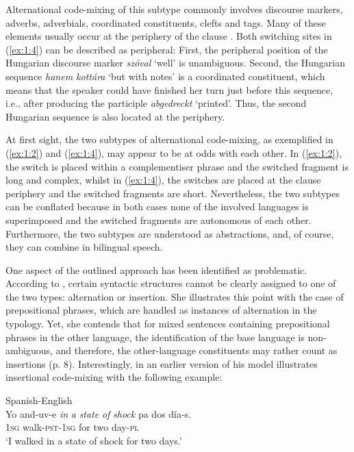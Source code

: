 \noindent Alternational code-mixing of this subtype commonly involves discourse markers, adverbs, adverbials, coordinated constituents, clefts and tags. Many of these elements usually occur at the periphery of the clause \citep[97--99]{muysken-bilingual-2000}. Both switching sites in (\ref{ex:1:4}) can be described as peripheral: First, the peripheral position of the Hungarian discourse marker \textit{szóval} `well' is unambiguous. Second, the Hungarian sequence \textit{hanem kottára} `but with notes' is a coordinated constituent, which means that the speaker could have finished her turn just before this sequence, i.e., after producing the participle \textit{abgedreckt} `printed'. Thus, the second Hungarian sequence is also located at the periphery.

At first sight, the two subtypes of alternational code-mixing, as exemplified in (\ref{ex:1:2}) and (\ref{ex:1:4}), may appear to be at odds with each other. In (\ref{ex:1:2}), the switch is placed within a complementiser phrase and the switched fragment is long and complex, whilst in (\ref{ex:1:4}), the switches are placed at the clause periphery and the switched fragments are short. Nevertheless, the two subtypes can be conflated because in both cases none of the involved languages is superimposed and the switched fragments are autonomous of each other. Furthermore, the two subtypes are understood as abstractions, and, of course, they can combine in bilingual speech.

One aspect of the outlined approach has been identified as problematic. According to \citet[][7]{muhamedowa-untersuchung-2006}, certain syntactic structures cannot be clearly assigned to one of the two types: alternation or insertion. She illustrates this point with the case of prepositional phrases, which are handled as instances of alternation in the typology. Yet, she contends that for mixed sentences containing prepositional phrases in the other language, the identification of the base language is non-ambiguous, and therefore, the other-language constituents may rather count as insertions (p. 8). Interestingly, in an earlier version of his model \citet{muysken-code-switching-1997} illustrates insertional code-mixing with the following example:

\ea{\label{ex:1:5}}
Spanish-English \citep[296]{pfaff-1979}\\
\gll Yo and-uv-e \textit{in} \textit{a} \textit{state} \textit{of} \textit{shock} pa dos día-s.\\
 \textsc{1sg} walk-\textsc{pst-1sg} {} {} {} {} {} for two day-\textsc{pl}\\
\glt `I walked in a state of shock for two days.' 
\z

